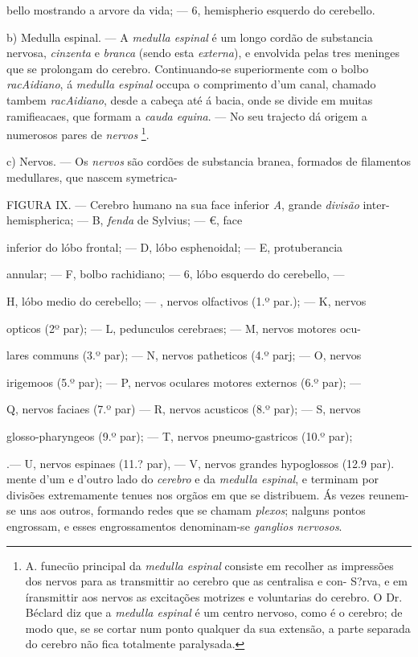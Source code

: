 bello mostrando a arvore da vida; --- 6, hemispherio esquerdo do cerebello.

b) Medulla espinal. --- A \emph{medulla espinal} é um longo cordão de substancia nervosa, \emph{cinzenta} e \emph{branca} (sendo esta \emph{externa}), e envolvida pelas tres meninges que se prolongam do cerebro. Continuando-se superiormente com o bolbo \emph{racAidiano}, á   \emph{medulla espinal} occupa o comprimento d'um canal, chamado tambem \emph{racAidiano}, desde a cabeça até á bacia, onde se divide em muitas ramifieacaes, que formam a \emph{cauda equina}. --- No seu trajecto dá origem a numerosos pares de \emph{nervos} \footnote{A. funecüo principal da \emph{medulla espinal} consiste em recolher as impressões dos nervos para as transmittir ao cerebro que as centralisa e con- S?rva, e em íransmittir aos nervos as excitações motrizes e voluntarias do cerebro. O Dr. Béclard diz que a \emph{medulla espinal} é um centro nervoso, como é o cerebro; de modo que, se se cortar num ponto qualquer da sua extensão, a parte separada do cerebro não fica totalmente paralysada.}.

c) Nervos. --- Os \emph{nervos} são cordões de substancia branea, formados de filamentos medullares, que nascem symetrica-

FIGURA IX. --- Cerebro humano na sua face inferior \emph{A}, grande \emph{divisão} inter- hemispherica; --- B, \emph{fenda} de Sylvius; --- €, face

inferior do lóbo frontal; --- D, lóbo esphenoidal; --- E, protuberancia

annular; --- F, bolbo rachidiano; --- 6, lóbo esquerdo do cerebello, ---

H, lóbo medio do cerebello; --- \textbar{}, nervos olfactivos (1.º par.); --- K, nervos

opticos (2º par); --- L, pedunculos cerebraes; --- M, nervos motores ocu-

lares communs (3.º par); --- N, nervos patheticos (4.º parj; --- O, nervos

irigemoos (5.º par); --- P, nervos oculares motores externos (6.º par); ---

Q, nervos faciaes (7.º par) --- R, nervos acusticos (8.º par); --- S, nervos

glosso-pharyngeos (9.º par); --- T, nervos pneumo-gastricos (10.º par);

.--- U, nervos espinaes (11.? par), --- V, nervos grandes hypoglossos (12.9 par). mente d'um e d'outro lado do \emph{cerebro} e da \emph{medulla espinal}, e terminam por divisões extremamente tenues nos orgãos em que se distribuem. Ás vezes reunem-se uns aos outros, formando redes que se chamam \emph{plexos}; nalguns pontos engrossam, e esses engrossamentos denominam-se \emph{ganglios nervosos}.

